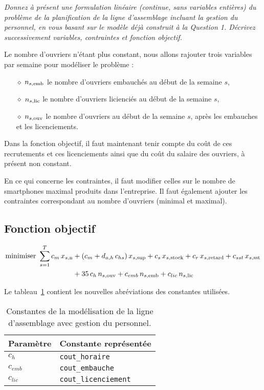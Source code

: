 \question %
\emph{Donnez à présent une formulation linéaire (continue, sans variables
entières) du problème de la planification de la ligne d'assemblage
incluant la gestion du personnel, en vous basant sur le modèle déjà
construit à la Question 1. Décrivez successivement variables,
contraintes et fonction objectif.}

Le nombre d'ouvriers n'étant plus constant, nous allons rajouter trois variables
par semaine pour modéliser le problème :
\begin{itemize}
  \item[$\diamond$] $n_{s,\text{emb}}$ le nombre d'ouvriers embauchés au début de la semaine $s$,
  \item[$\diamond$] $n_{s,\text{lic}}$ le nombre d'ouvriers licienciés au début de la semaine $s$,
  \item[$\diamond$] $n_{s,\text{ouv}}$ le nombre d'ouvriers au début de la semaine $s$,
  après les embauches et les licenciements.
\end{itemize}

Dans la fonction objectif, il faut maintenant tenir compte du coût de
ces recrutements et ces licenciements
ainsi que du coût du salaire des ouvriers, à présent non constant.

En ce qui concerne les contraintes, il faut modifier celles sur
le nombre de smartphones maximal produits dans l'entreprise.
Il faut également ajouter les contraintes correspondant
au nombre d'ouvriers (minimal et maximal).

\subsection*{Fonction objectif}
\begin{align*}
  \mbox{minimiser }
  \sum_{s=1}^{T}
  c_m\, x_{s,\text{n}} &+ (c_m + d_{a,h} \, c_{hs})\, x_{s,\text{sup}}
  + c_s\, x_{s,\text{stock}} + c_r\, x_{s,\text{retard}} + c_{sst}\, x_{s,\text{sst}} \\
  &+ 35 \, c_{h} \, n_{s,\text{ouv}}
  + c_{emb} \, n_{s,\text{emb}} + c_{lic} \, n_{s,\text{lic}}
\end{align*}

Le tableau~\ref{tab:constantesQuestion7} contient les nouvelles abréviations
des constantes utilisées.
\begin{table}[h]
  \begin{center}
  \begin{tabular}{|l|l|}
    \hline
    Paramètre & Constante représentée \\
    \hline
    \hline
    $c_{h}$ & \texttt{cout\_horaire} \\
    \hline
    $c_{emb}$ & \texttt{cout\_embauche} \\
    \hline
    $c_{lic}$ & \texttt{cout\_licenciement} \\
    \hline
  \end{tabular}
  \caption{Constantes de la modélisation de la ligne d'assemblage
  avec gestion du personnel.}
  \label{tab:constantesQuestion7}
  \end{center}
\end{table}

